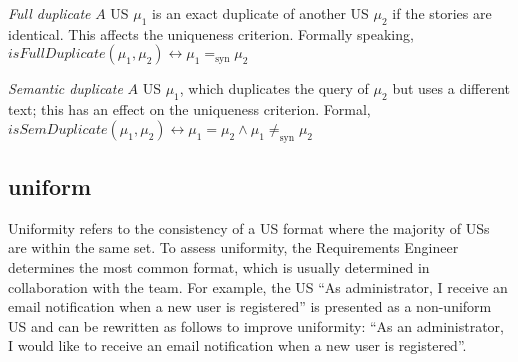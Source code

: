\begin{definition}
\emph{Full duplicate} $A$ US $\mu_1$ is an exact duplicate of another US $\mu_2$ if the stories are identical. This affects the uniqueness criterion. Formally speaking, \\ 
$isFullDuplicate(\mu_1,\mu_2) \leftrightarrow \mu_1 =_{\text{syn}} \mu_2$
\end{definition}
\begin{definition}
\emph{Semantic duplicate} $A$ US $\mu_1$, which duplicates the query of $\mu_2$ but uses a different text; this has an effect on the uniqueness criterion. Formal,\\ 
$isSemDuplicate(\mu_1,\mu_2) \leftrightarrow \mu_1 = \mu_2 \wedge \mu_1 \neq _{\text{syn}} \mu_2$
\end{definition}
\subsection*{\normalsize{uniform}}
Uniformity refers to the consistency of a US format where the majority of USs are within the same set. To assess uniformity, the Requirements Engineer determines the most common format, which is usually determined in collaboration with the team. For example, the US \enquote{As administrator, I receive an email notification when a new user is registered} is presented as a non-uniform US and can be rewritten as follows to improve uniformity: \enquote{As an administrator, I would like to receive an email notification when a new user is registered}.

